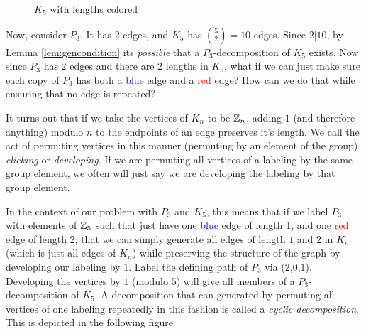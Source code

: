 \begin{figure}[H]
  \begin{center}
  \end{center}
  \caption{$K_{5}$ with lengths colored}
  \label{fig:K5colored}
\end{figure}
Now, consider $P_{3}$. It has $2$ edges, and $K_{5}$ has $\binom{5}{2}=10$ edges. Since $2|10$, by Lemma \ref{lem:gencondition} its \textit{possible} that a $P_{3}$-decomposition of $K_{5}$ exists. Now since $P_{3}$ has $2$ edges and there are $2$ lengths in $K_{5}$, what if we can just make sure each copy of $P_{3}$ has both a \textcolor{blue}{blue} edge and a \textcolor{red}{red} edge? How can we do that while ensuring that no edge is repeated?

It turns out that if we take the vertices of $K_{n}$ to be $\mathbb{Z}_{n}$, adding $1$ (and therefore anything) modulo $n$ to the endpoints of an edge preserves it's length. We call the act of permuting vertices in this manner (permuting by an element of the group) \textit{clicking} or \textit{developing}. If we are permuting all vertices of a labeling by the same group element, we often will just say we are developing the labeling by that group element.

In the context of our problem with $P_{3}$ and $K_{5}$, this means that if we label $P_{3}$ with elements of $\mathbb{Z}_{5}$ such that just have one \textcolor{blue}{blue} edge of length 1, and one \textcolor{red}{red} edge of length 2, that we can simply generate all edges of length $1$ and $2$ in $K_{n}$ (which is just all edges of $K_{n}$) while preserving the structure of the graph by developing our labeling by $1$. Label the defining path of $P_{3}$ via (2,0,1). Developing the vertices by $1$ (modulo $5$) will give all members of a $P_{3}$-decomposition of $K_{5}$. A decomposition that can generated by permuting all vertices of one labeling repeatedly in this fashion is called a \textit{cyclic decomposition}. This is depicted in the following figure.

